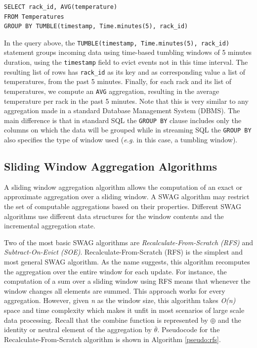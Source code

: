 \begin{verbatim}
SELECT rack_id, AVG(temperature)
FROM Temperatures
GROUP BY TUMBLE(timestamp, Time.minutes(5), rack_id)
\end{verbatim}

In the query above, the
\texttt{TUMBLE(timestamp, Time.minutes(5), rack\_id)} statement groups incoming data using time-based tumbling windows of 5 minutes duration, using the \texttt{timestamp} field to evict events not in this time interval. The resulting list of rows has \texttt{rack\_id} as its key and as corresponding value a list of temperatures, from the past 5 minutes. Finally, for each rack and its list of temperatures, we compute an \texttt{AVG} aggregation, resulting in the average temperature per rack in the past 5 minutes. Note that this is very similar to any aggregation made in a standard Database Management System (DBMS). The main difference is that in standard SQL the \texttt{GROUP BY} clause includes only the columns on which the data will be grouped while in streaming SQL the \texttt{GROUP BY} also specifies the type of window used (\textit{e.g.} in this case, a tumbling window).


\subsection{Sliding Window Aggregation Algorithms} \label{sec:back-swag-algs}

A sliding window aggregation algorithm allows the computation of an exact or approximate aggregation over a sliding window. A SWAG algorithm may restrict the set of computable aggregations based on their properties. Different SWAG algorithms use different data structures for the window contents and the incremental aggregation state.

Two of the most basic SWAG algorithms are \textit{Recalculate-From-Scratch (RFS)} and \textit{Subtract-On-Evict (SOE)}. Recalculate-From-Scratch (RFS) is the simplest and most general SWAG algorithm. As the name suggests, this algorithm recomputes the aggregation over the entire window for each update. For instance, the computation of a sum over a sliding window using RFS means that whenever the window changes all elements are summed. This approach works for every aggregation. However, given \textit{n} as the window size, this algorithm takes \textit{O(n)} space and time complexity which makes it unfit in most scenarios of large scale data processing. Recall that the combine function is represented by $\oplus$ and the identity or neutral element of the aggregation by $\overline{\theta}$. Pseudocode for the Recalculate-From-Scratch algorithm is shown in Algorithm \ref{pseudo:rfs}.
  

